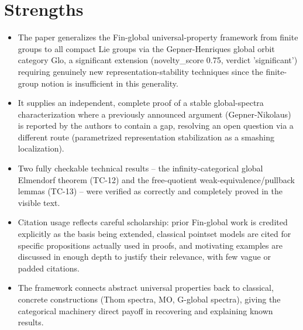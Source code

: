 \documentclass[11pt]{article}
\begin{document}
\section*{Strengths}
\begin{itemize}[leftmargin=*]
  \item The paper generalizes the Fin-global universal-property framework from finite groups to all compact Lie groups via the Gepner-Henriques global orbit category Glo, a significant extension (novelty\_score 0.75, verdict 'significant') requiring genuinely new representation-stability techniques since the finite-group notion is insufficient in this generality.
  \item It supplies an independent, complete proof of a stable global-spectra characterization where a previously announced argument (Gepner-Nikolaus) is reported by the authors to contain a gap, resolving an open question via a different route (parametrized representation stabilization as a smashing localization).
  \item Two fully checkable technical results -- the infinity-categorical global Elmendorf theorem (TC-12) and the free-quotient weak-equivalence/pullback lemmas (TC-13) -- were verified as correctly and completely proved in the visible text.
  \item Citation usage reflects careful scholarship: prior Fin-global work is credited explicitly as the basis being extended, classical pointset models are cited for specific propositions actually used in proofs, and motivating examples are discussed in enough depth to justify their relevance, with few vague or padded citations.
  \item The framework connects abstract universal properties back to classical, concrete constructions (Thom spectra, MO, G-global spectra), giving the categorical machinery direct payoff in recovering and explaining known results.
\end{itemize}
\end{document}
